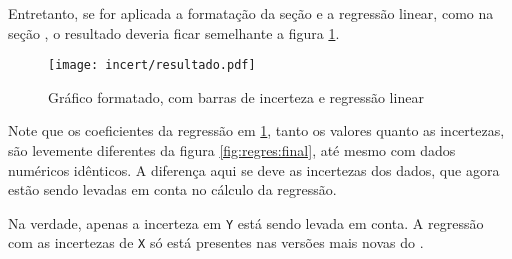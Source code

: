    Entretanto, se for aplicada a formatação da seção  e a regressão linear, como na seção , o resultado deveria ficar semelhante a figura \ref{fig:incert:resultado}.

    \begin{figure}[htbp]
        \centering
        \texttt{[image: incert/resultado.pdf]}

        \caption{Gráfico formatado, com barras de incerteza e regressão linear}
        \label{fig:incert:resultado}
    \end{figure}

    \begin{nota}
        Note que os coeficientes da regressão em \ref{fig:incert:resultado}, tanto os valores quanto as incertezas, são levemente diferentes da figura \ref{fig:regres:final}, até mesmo com dados numéricos idênticos. A diferença aqui se deve as incertezas dos dados, que agora estão sendo levadas em conta no cálculo da regressão.

        Na verdade, apenas a incerteza em \texttt{Y} está sendo levada em conta. A regressão com as incertezas de \texttt{X} só está presentes nas versões mais novas do \software.
    \end{nota}
